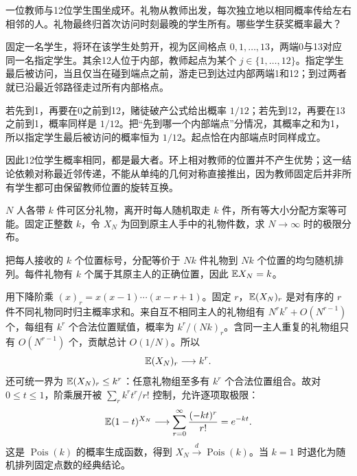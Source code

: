 \begin{example}[原题2：圆周游走中最后被访问的人]\label{yau:2018-2}
一位教师与12位学生围坐成环。礼物从教师出发，每次独立地以相同概率传给左右相邻的人。礼物最终归首次访问时刻最晚的学生所有。哪些学生获奖概率最大？
\end{example}
\begin{solve}
固定一名学生，将环在该学生处剪开，视为区间格点 $0,1,\ldots,13$，两端0与13对应同一名指定学生。其余12人位于内部，教师起点为某个 $j\in\{1,\ldots,12\}$。指定学生最后被访问，当且仅当在碰到端点之前，游走已到达过内部两端1和12；到过两者就已沿最近邻路径走过所有内部格点。

若先到1，再要在0之前到12，赌徒破产公式给出概率 $1/12$；若先到12，再要在13之前到1，概率同样是 $1/12$。把“先到哪一个内部端点”分情况，其概率之和为1，所以指定学生最后被访问的概率恒为 $1/12$。起点恰在内部端点时同样成立。

因此12位学生概率相同，都是最大者。环上相对教师的位置并不产生优势；这一结论依赖对称最近邻传递，不能从单纯的几何对称直接推出，因为教师固定后并非所有学生都可由保留教师位置的旋转互换。
\end{solve}

\begin{example}[原题3：多人各带多件礼物的归还数]\label{yau:2018-3}
$N$ 人各带 $k$ 件可区分礼物，离开时每人随机取走 $k$ 件，所有等大小分配方案等可能。固定正整数 $k$，令 $X_N$ 为回到原主人手中的礼物件数，求 $N\to\infty$ 时的极限分布。
\end{example}
\begin{solve}
把每人接收的 $k$ 个位置标号，分配等价于 $Nk$ 件礼物到 $Nk$ 个位置的均匀随机排列。每件礼物有 $k$ 个属于其原主人的正确位置，因此 $\mathbb E X_N=k$。

用下降阶乘 $(x)_r=x(x-1)\cdots(x-r+1)$。固定 $r$，$\mathbb E(X_N)_r$ 是对有序的 $r$ 件不同礼物同时归主概率求和。来自互不相同主人的礼物组有 $N^rk^r+O(N^{r-1})$ 个，每组有 $k^r$ 个合法位置赋值，概率为 $k^r/(Nk)_r$。含同一主人重复的礼物组只有 $O(N^{r-1})$ 个，贡献总计 $O(1/N)$。所以
\[
\mathbb E(X_N)_r\longrightarrow k^r.
\]
还可统一界为 $\mathbb E(X_N)_r\le k^r$：任意礼物组至多有 $k^r$ 个合法位置组合。故对 $0\le t\le1$，阶乘展开被 $\sum_rk^rt^r/r!$ 控制，允许逐项取极限：
\[
\mathbb E(1-t)^{X_N}\longrightarrow\sum_{r=0}^\infty\frac{(-kt)^r}{r!}=e^{-kt}.
\]
这是 $\operatorname{Pois}(k)$ 的概率生成函数，得到 $X_N\xrightarrow d\operatorname{Pois}(k)$。当 $k=1$ 时退化为随机排列固定点数的经典结论。
\end{solve}

